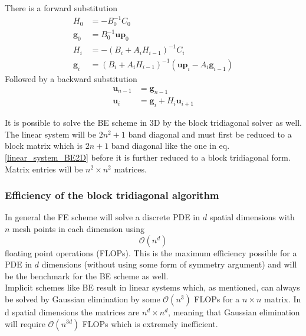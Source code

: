 \noindent There is a forward substitution
\begin{align}\label{block_tridiag_alg}
 H_0 &= -B_0^{-1}C_0\nonumber \\
 \mathbf{g}_0 &= B_0^{-1}\mathbf{up}_0 \nonumber\\
 H_i &= -\left(B_i+A_iH_{i-1}\right)^{-1}C_i \nonumber \\
 \mathbf{g}_i &= \left(B_i+A_iH_{i-1}\right)^{-1}\left(\mathbf{up}_i-A_i\mathbf{g}_{i-1}\right)
 \end{align}
 Followed by a backward substitution
 \begin{align*}
  \mathbf{u}_{n-1} &= \mathbf{g}_{n-1}\nonumber\\
  \mathbf{u}_i &= \mathbf{g}_i + H_i\mathbf{u}_{i+1} \nonumber
 \end{align*}
 
 \noindent It is possible to solve the BE scheme in 3D by the block tridiagonal solver as well. 
 The linear system will be $2n^2 +1$ band diagonal and must first be reduced to a block matrix which is $2n+1$ band diagonal like the one in eq. \eqref{linear_system_BE2D} before it is further reduced to a block tridiagonal form. 
 Matrix entries will be $n^2\times n^2$ matrices.
 
 \subsubsection{Efficiency of the block tridiagonal algorithm}
 
 In general the FE scheme will solve a discrete PDE in $d$ spatial dimensions with $n$ mesh points in each dimension using
 \begin{equation*}
  \mathcal O(n^d)
 \end{equation*}
floating point operations (FLOPs). 
This is the maximum efficiency possible for a PDE in $d$ dimensions (without using some form of symmetry argument) and will be the benchmark for the BE scheme as well.\\

Implicit schemes like BE result in linear systems which, as mentioned, can always be solved by Gaussian elimination by some $\mathcal O(n^3)$ FLOPs for a $n\times n$ matrix. 
In d spatial dimensions the matrices are $n^d\times n^d$, meaning that Gaussian elimination will require $\mathcal{O}(n^{3d})$ FLOPs which is extremely inefficient. 


